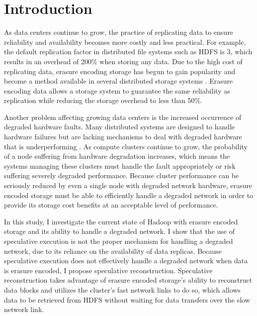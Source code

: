 \documentclass{ucetd}
\begin{document}
\mainmatter


\chapter{Introduction}
\label{ch:introduction}

As data centers continue to grow, the practice of replicating data to ensure
reliability and availability becomes more costly and less practical. For
example, the default replication factor in distributed file systems such as HDFS
is 3, which results in an overhead of 200\% when storing any data. Due to the
high cost of replicating data, erasure encoding storage has begun to gain
popularity and become a method available in several distributed storage systems
\cite{Fan, Calder}. Erasure encoding data allows a storage system to guarantee
the same reliability as replication while reducing the storage overhead to less
than 50\%.

Another problem affecting growing data centers is the increased occurrence of
degraded hardware faults. Many distributed systems are designed to handle
hardware failures but are lacking mechanisms to deal with degraded hardware that
is underperforming \cite{Do}. As compute clusters continue to grow, the
probability of a node suffering from hardware degradation increases, which
means the systems managing these clusters must handle the fault appropriately or
risk suffering severely degraded performance. Because cluster performance can be
seriously reduced by even a single node with degraded network hardware, erasure
encoded storage must be able to efficiently handle a degraded network in order
to provide its storage cost benefits at an acceptable level of performance.

In this study, I investigate the current state of Hadoop with erasure encoded
storage and its ability to handle a degraded network. I show that the use of
speculative execution is not the proper mechanism for handling a degraded
network, due to its reliance on the availability of data replicas. Because
speculative execution does not effectively handle a degraded network when data
is erasure encoded, I propose speculative reconstruction.  Speculative
reconstruction takes advantage of erasure encoded storage's ability to
reconstruct data blocks and utilizes the cluster's fast network links to do so,
which allows data to be retrieved from HDFS without waiting for data transfers
over the slow network link.
\end{document}
